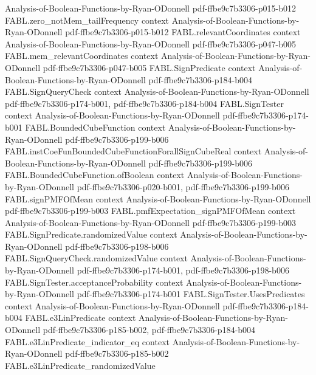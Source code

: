 \begin{theorem}
  {Analysis-of-Boolean-Functions-by-Ryan-ODonnell}
  {pdf-ffbe9c7b3306-p015-b012}
\proofstep
  {FABL.zero_notMem_tailFrequency}
  {context}
  {Analysis-of-Boolean-Functions-by-Ryan-ODonnell}
  {pdf-ffbe9c7b3306-p015-b012}
\proofstep
  {FABL.relevantCoordinates}
  {context}
  {Analysis-of-Boolean-Functions-by-Ryan-ODonnell}
  {pdf-ffbe9c7b3306-p047-b005}
\proofstep
  {FABL.mem_relevantCoordinates}
  {context}
  {Analysis-of-Boolean-Functions-by-Ryan-ODonnell}
  {pdf-ffbe9c7b3306-p047-b005}
\proofstep
  {FABL.SignPredicate}
  {context}
  {Analysis-of-Boolean-Functions-by-Ryan-ODonnell}
  {pdf-ffbe9c7b3306-p184-b004}
\proofstep
  {FABL.SignQueryCheck}
  {context}
  {Analysis-of-Boolean-Functions-by-Ryan-ODonnell}
  {pdf-ffbe9c7b3306-p174-b001,
    pdf-ffbe9c7b3306-p184-b004}
\proofstep
  {FABL.SignTester}
  {context}
  {Analysis-of-Boolean-Functions-by-Ryan-ODonnell}
  {pdf-ffbe9c7b3306-p174-b001}
\proofstep
  {FABL.BoundedCubeFunction}
  {context}
  {Analysis-of-Boolean-Functions-by-Ryan-ODonnell}
  {pdf-ffbe9c7b3306-p199-b006}
\proofstep
  {FABL.instCoeFunBoundedCubeFunctionForallSignCubeReal}
  {context}
  {Analysis-of-Boolean-Functions-by-Ryan-ODonnell}
  {pdf-ffbe9c7b3306-p199-b006}
\proofstep
  {FABL.BoundedCubeFunction.ofBoolean}
  {context}
  {Analysis-of-Boolean-Functions-by-Ryan-ODonnell}
  {pdf-ffbe9c7b3306-p020-b001,
    pdf-ffbe9c7b3306-p199-b006}
\proofstep
  {FABL.signPMFOfMean}
  {context}
  {Analysis-of-Boolean-Functions-by-Ryan-ODonnell}
  {pdf-ffbe9c7b3306-p199-b003}
\proofstep
  {FABL.pmfExpectation_signPMFOfMean}
  {context}
  {Analysis-of-Boolean-Functions-by-Ryan-ODonnell}
  {pdf-ffbe9c7b3306-p199-b003}
\proofstep
  {FABL.SignPredicate.randomizedValue}
  {context}
  {Analysis-of-Boolean-Functions-by-Ryan-ODonnell}
  {pdf-ffbe9c7b3306-p198-b006}
\proofstep
  {FABL.SignQueryCheck.randomizedValue}
  {context}
  {Analysis-of-Boolean-Functions-by-Ryan-ODonnell}
  {pdf-ffbe9c7b3306-p174-b001,
    pdf-ffbe9c7b3306-p198-b006}
\proofstep
  {FABL.SignTester.acceptanceProbability}
  {context}
  {Analysis-of-Boolean-Functions-by-Ryan-ODonnell}
  {pdf-ffbe9c7b3306-p174-b001}
\proofstep
  {FABL.SignTester.UsesPredicates}
  {context}
  {Analysis-of-Boolean-Functions-by-Ryan-ODonnell}
  {pdf-ffbe9c7b3306-p184-b004}
\proofstep
  {FABL.e3LinPredicate}
  {context}
  {Analysis-of-Boolean-Functions-by-Ryan-ODonnell}
  {pdf-ffbe9c7b3306-p185-b002,
    pdf-ffbe9c7b3306-p184-b004}
\proofstep
  {FABL.e3LinPredicate_indicator_eq}
  {context}
  {Analysis-of-Boolean-Functions-by-Ryan-ODonnell}
  {pdf-ffbe9c7b3306-p185-b002}
\proofstep
  {FABL.e3LinPredicate_randomizedValue}

\end{theorem}
